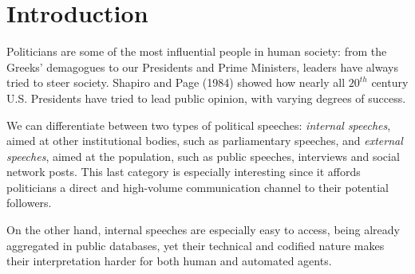 \section{Introduction}

Politicians are some of the most influential people in human society: from the Greeks' demagogues to our Presidents and Prime Ministers, leaders have always tried to steer society. Shapiro and Page (1984) \cite{page_presidents_1984} showed how nearly all $20^{th}$ century U.S. Presidents have tried to lead public opinion, with varying degrees of success.

We can differentiate between two types of political speeches: \textit{internal speeches}, aimed at other institutional bodies, such as parliamentary speeches, and \textit{external speeches}, aimed at the population, such as public speeches, interviews and social network posts. This last category is especially interesting since it affords politicians a direct and high-volume communication channel to their potential followers.

On the other hand, internal speeches are especially easy to access, being already aggregated in public databases, yet their technical and codified nature makes their interpretation harder for both human and automated agents.
